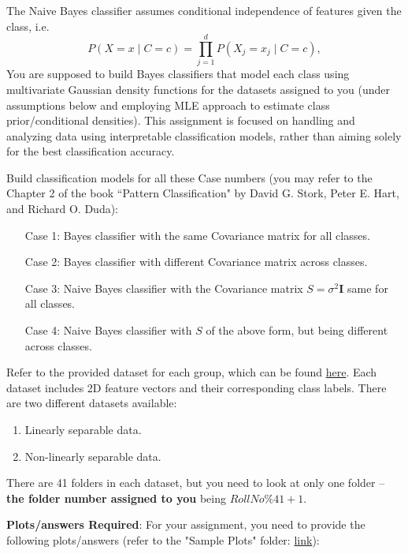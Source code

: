 \documentclass[solution,addpoints,12pt]{exam}
\begin{document}
\begin{questions}
The Naive Bayes classifier assumes conditional independence of features given the class, i.e. 
\[
P(X=x \mid C=c) = \prod_{j=1}^d P(X_j = x_j \mid C=c),
\]
You are supposed to build Bayes classifiers that model each class using multivariate Gaussian density functions for the datasets assigned to you (under assumptions below and employing MLE approach to estimate class prior/conditional densities). This assignment is focused on handling and analyzing data using interpretable classification models, rather than aiming solely for the best classification accuracy. 
    
Build classification models for all these Case numbers (you may refer to the Chapter 2 of the book ``Pattern Classification" by David G. Stork, Peter E. Hart, and Richard O. Duda):
\begin{enumerate}
    \item[Case 1:] Bayes classifier with the same Covariance matrix for all classes.
    \item[Case 2:] Bayes classifier with different Covariance matrix across classes.
    \item[Case 3:] Naive Bayes classifier with the Covariance matrix $S = \sigma^2 \mathbf{I}$ same for all classes.
    \item[Case 4:] Naive Bayes classifier with $S$ of the above form, but being different across classes.
\end{enumerate}
    
Refer to the provided dataset for each group, which can be found  \href{https://drive.google.com/drive/folders/1YwSDijf-LOF3HZwSBoMc5R02TH_o12s3?usp=sharing}{here}. Each dataset includes 2D feature vectors and their corresponding class labels. There are two different datasets available:
\begin{enumerate}
    \item Linearly separable data.
    \item Non-linearly separable data.
\end{enumerate}
There are 41 folders in each dataset, but you need to look at only one folder -- {\bf the folder number assigned to you} being $RollNo\%41 + 1$.
    
\textbf{Plots/answers Required}:
For your assignment, you need to provide the following plots/answers (refer to the "Sample Plots" folder: \href{https://drive.google.com/drive/folders/1YwSDijf-LOF3HZwSBoMc5R02TH_o12s3?usp=sharing}{link}):
    
\begin{parts}

\end{parts}
\end{questions}
\end{document}
